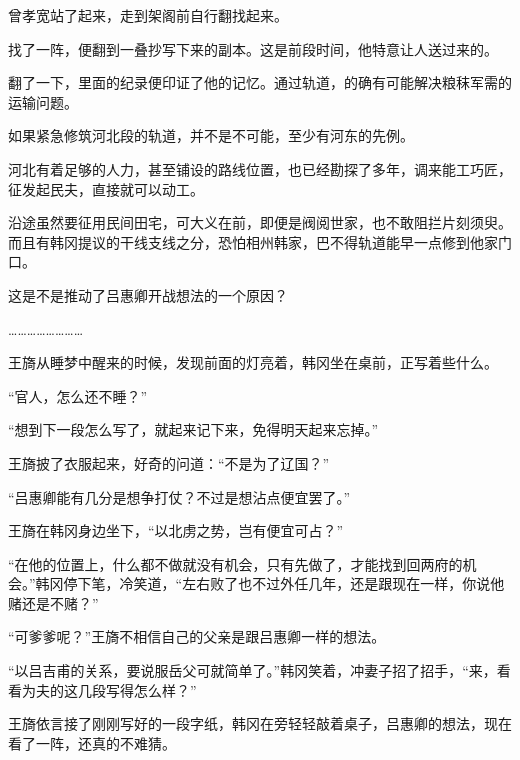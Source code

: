 曾孝宽站了起来，走到架阁前自行翻找起来。

找了一阵，便翻到一叠抄写下来的副本。这是前段时间，他特意让人送过来的。

翻了一下，里面的纪录便印证了他的记忆。通过轨道，的确有可能解决粮秣军需的运输问题。

如果紧急修筑河北段的轨道，并不是不可能，至少有河东的先例。

河北有着足够的人力，甚至铺设的路线位置，也已经勘探了多年，调来能工巧匠，征发起民夫，直接就可以动工。

沿途虽然要征用民间田宅，可大义在前，即便是阀阅世家，也不敢阻拦片刻须臾。而且有韩冈提议的干线支线之分，恐怕相州韩家，巴不得轨道能早一点修到他家门口。

这是不是推动了吕惠卿开战想法的一个原因？

……………………

王旖从睡梦中醒来的时候，发现前面的灯亮着，韩冈坐在桌前，正写着些什么。

“官人，怎么还不睡？”

“想到下一段怎么写了，就起来记下来，免得明天起来忘掉。”

王旖披了衣服起来，好奇的问道：“不是为了辽国？”

“吕惠卿能有几分是想争打仗？不过是想沾点便宜罢了。”

王旖在韩冈身边坐下，“以北虏之势，岂有便宜可占？”

“在他的位置上，什么都不做就没有机会，只有先做了，才能找到回两府的机会。”韩冈停下笔，冷笑道，“左右败了也不过外任几年，还是跟现在一样，你说他赌还是不赌？”

“可爹爹呢？”王旖不相信自己的父亲是跟吕惠卿一样的想法。

“以吕吉甫的关系，要说服岳父可就简单了。”韩冈笑着，冲妻子招了招手，“来，看看为夫的这几段写得怎么样？”

王旖依言接了刚刚写好的一段字纸，韩冈在旁轻轻敲着桌子，吕惠卿的想法，现在看了一阵，还真的不难猜。
